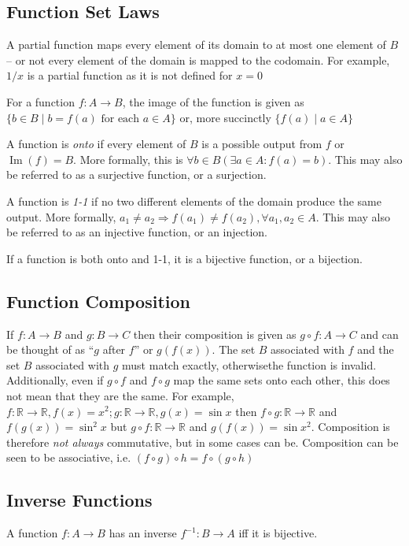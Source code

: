 \documentclass[10pt]{article}
\DeclareMathOperator*{\image}{Im}
\begin{document}
\subsection{Function Set Laws}
A partial function maps every element of its domain to at most one element of $B$ -- or not every element of the domain is mapped to the codomain.  For example, $1/x$ is a partial function as it is not defined for $x=0$

For a function $f:A\to B$, the image of the function is given as $\{b\in B\mid b=f(a)\text{ for each }a\in A\}$ or, more succinctly $\{f(a)\mid a \in A\}$

A function is \emph{onto} if every  element of $B$ is a possible output from $f$ or $\image(f)=B$.  More formally, this is $\forall b\in B (\exists a\in A : f(a)=b)$.  This may also be referred to as a surjective function, or a surjection.

A function is \emph{1-1} if no two different elements of the domain produce the same output.  More formally, $a_1\neq a_2\Rightarrow f(a_1)\neq f(a_2), \forall a_1,a_2\in A$.  This may also be referred to as an injective function, or an injection.

If a function is both onto and 1-1, it is a bijective function, or a bijection.
\subsection{Function Composition}
If $f:A\to B$ and $g:B\to C$ then their composition is given as $g\circ f:A\to C$ and can be thought of as ``$g$ after $f$'' or $g(f(x))$.  The set $B$ associated with $f$ and the set $B$ associated with $g$ must match exactly, otherwisethe function is invalid.  Additionally, even if $g\circ f$ and $f \circ g$ map the same sets onto each other, this does not mean that they are the same.  For example, $f:\mathbb R\to\mathbb R, f(x)=x^2;g:\mathbb R\to\mathbb R, g(x)=\sin x$ then $f\circ g:\mathbb R\to\mathbb R$ and $f(g(x)) = \sin^2x$ but  $g\circ f:\mathbb R\to\mathbb R$ and $g(f(x)) = \sin x^2$.  Composition is therefore \emph{not always} commutative, but in some cases can be.  Composition can be seen to be associative, i.e. $(f\circ g)\circ h=f\circ(g\circ h)$
\subsection{Inverse Functions}
A function $f:A\to B$ has an inverse $f^{-1}:B\to A$ iff it is bijective.
\end{document}
